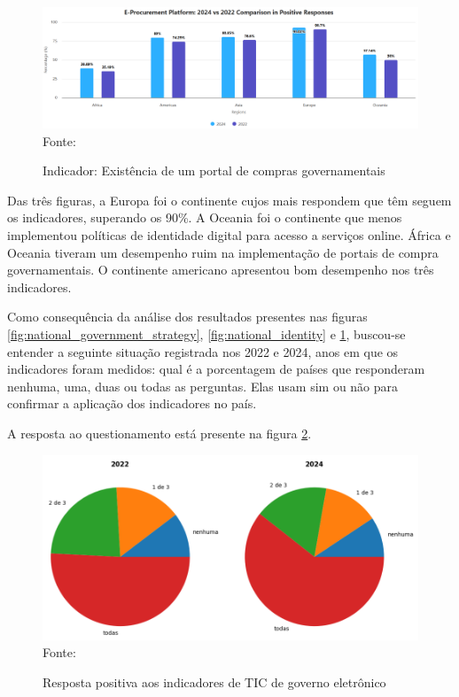 \begin{figure}[H]
	\centering
	\caption{Indicador: Existência de um portal de compras governamentais}
	\includegraphics[width=1\linewidth]{figuras/ict_in_government/procurement_portal}
	\label{fig:procurement_portal}
	\footnotesize{Fonte: \cite{ONU_ICT_in_government_indicators}}
\end{figure}

Das três figuras, a Europa foi o continente cujos mais respondem que têm seguem os indicadores, superando os 90\%. A Oceania foi o continente que menos implementou políticas de identidade digital para acesso a serviços online. África e Oceania tiveram um desempenho ruim na implementação de portais de compra governamentais. O continente americano apresentou bom desempenho nos três indicadores.

Como consequência da análise dos resultados presentes nas figuras \ref{fig:national_government_strategy}, \ref{fig:national_identity} e \ref{fig:procurement_portal}, buscou-se entender a seguinte situação registrada nos 2022 e 2024, anos em que os indicadores foram medidos: qual é a porcentagem de países que responderam nenhuma, uma, duas ou todas as perguntas. Elas usam sim ou não para confirmar a aplicação dos indicadores no país.

A resposta ao questionamento está presente na figura \ref{fig:indicators_answer}.

\begin{figure}[H]
	\centering
	\caption{Resposta positiva aos indicadores de TIC de governo eletrônico}
	\includegraphics[width=1\linewidth]{figuras/ict_in_government/indicators_answer}
	\label{fig:indicators_answer}
	\footnotesize{Fonte: \cite{ONU_ICT_in_government_indicators}}
\end{figure}

